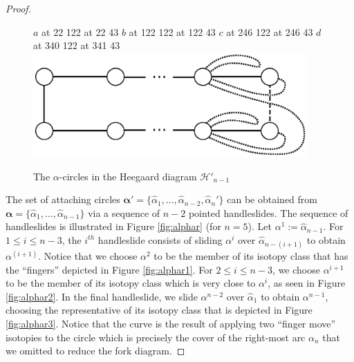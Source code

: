 \documentclass[11pt]{article}
\theoremstyle{plain} \newtheorem{thm}{Theorem}[subsection]
\theoremstyle{plain} \newtheorem{cor}[thm]{Corollary}
\theoremstyle{plain} \newtheorem{prop}[thm]{Proposition}
\theoremstyle{plain} \newtheorem{conj}[thm]{Conjecture}
\theoremstyle{plain} \newtheorem{lem}[thm]{Lemma}
\theoremstyle{definition} \newtheorem{df}[thm]{Definition}
\theoremstyle{remark} \newtheorem{rmk}[thm]{Remark}
\theoremstyle{remark} \newtheorem{obs}[thm]{Observation}
\newcommand{\h}{\mathcal{H}}
\newcommand{\ah}{\widehat{\alpha}}
\newcommand{\ba}{\boldsymbol{\alpha}}
\numberwithin{equation}{section}
\begin{document}
\begin{proof}
\begin{figure}[h!]
\begin{center}
\begin{minipage}[c]{.60\linewidth}
\small
\pinlabel $a$ at 22 122
\pinlabel {} at 22 43
\pinlabel $b$ at 122 122
\pinlabel {} at 122 43
\pinlabel $c$ at 246 122
\pinlabel {} at 246 43
\pinlabel $d$ at 340 122
\pinlabel {} at 341 43
\endlabellist
\includegraphics[height = 40mm]{RedalphaH}
\end{minipage}
\begin{minipage}[c]{.30\linewidth}
\caption[The Heegaard diagram covering Figure \ref{fig:redalpha}]{The $\alpha$-circles in the Heegaard diagram $\h'_{n-1}$\label{fig:redalphaH}}
\end{minipage}
\end{center}
\end{figure}

The set of attaching circles $\ba' = \{ \ah_{1}, \ldots, \ah_{n-2}, \ah_{n}' \}$ can be obtained from $\ba = \{ \ah_{1}, \ldots, \ah_{n-1} \}$ via a sequence of $n-2$ pointed handleslides.  The sequence of handleslides is illustrated in Figure \ref{fig:alphar} (for $n=5$).  Let $\alpha^1:=\ah_{n-1}$.  For $1 \leq i \leq n-3$, the $i^{th}$ handleslide consists of sliding $\alpha^i$ over $\ah_{n-(i+1)}$ to obtain $\alpha^(i+1)$.  Notice that we choose $\alpha^2$ to be the member of its isotopy class that has the ``fingers'' depicted in Figure \ref{fig:alphar1}.  For $2 \leq i \leq n-3$, we choose $\alpha^{i+1}$ to be the member of its isotopy class which is very close to $\alpha^{i}$, as seen in Figure \ref{fig:alphar2}.  In the final handleslide, we slide $\alpha^{n-2}$ over $\ah_{1}$ to obtain $\alpha^{n-1}$, choosing the representative of its isotopy class that is depicted in Figure \ref{fig:alphar3}.  Notice that the curve is the result of applying two ``finger move'' isotopies to the circle which is precisely the cover of the right-most arc $\alpha_n$ that we omitted to reduce the fork diagram.


\end{proof}
\end{document}
